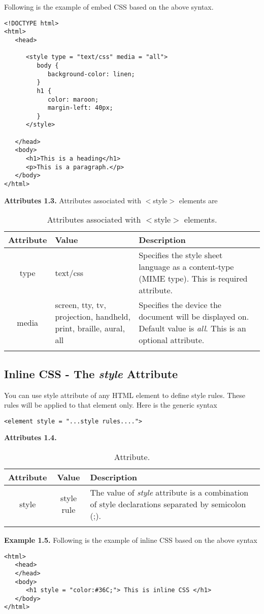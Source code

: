 \documentclass[a4paper,oneside]{book}
\numberwithin{equation}{chapter}
\begin{document}
Following is the example of embed CSS based on the above syntax.
\begin{verbatim}
<!DOCTYPE html>
<html>
   <head>
   
      <style type = "text/css" media = "all">
         body {
            background-color: linen;
         }
         h1 {
            color: maroon;
            margin-left: 40px;
         }
      </style>
      
   </head>   
   <body>
      <h1>This is a heading</h1>
      <p>This is a paragraph.</p>
   </body>
</html>
\end{verbatim}
\textbf{Attributes 1.3.} Attributes associated with $<$style$>$ elements are 
\begin{center}
\begin{longtable}{|c|p{3cm}|p{6cm}|}
\hline
\textbf{Attribute} & \textbf{Value} & \textbf{Description}\\
\hline
type & text/css & Specifies the style sheet language as a content-type (MIME type). This is required attribute.\\
\hline
media & screen, tty, tv, projection, handheld, print, braille, aural, all & Specifies the device the document will be displayed on. Default value is \textit{all}. This is an optional attribute.\\
\hline
\caption{Attributes associated with $<$style$>$ elements.}
\end{longtable}
\end{center}
\subsection{Inline CSS - The \textit{style} Attribute}
You can use style attribute of any HTML element to define style rules. These rules will be applied to that element only. Here is the generic syntax
\begin{verbatim}
<element style = "...style rules....">
\end{verbatim}
\textbf{Attributes 1.4.}
\begin{center}
\begin{longtable}{|c|c|p{8cm}|}
\hline
\textbf{Attribute} & \textbf{Value} & \textbf{Description}\\
\hline
style & style rule & The value of \textit{style} attribute is a combination of style declarations separated by semicolon (;).\\
\hline
\caption{Attribute.} 
\end{longtable}
\end{center}
\textbf{Example 1.5.} Following is the example of inline CSS based on the above syntax 
\begin{verbatim}
<html>
   <head>
   </head>
   <body>
      <h1 style = "color:#36C;"> This is inline CSS </h1>
   </body>
</html>
\end{verbatim}
\end{document}
